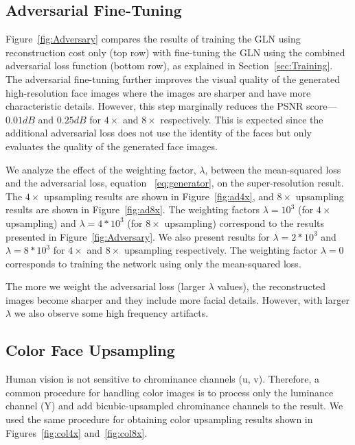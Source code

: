 \documentclass[runningheads]{llncs}
\begin{document}
\subsection{Adversarial Fine-Tuning}

Figure~\ref{fig:Adversary} compares the results of training the GLN using reconstruction cost only (top row) with fine-tuning the GLN using the combined adversarial loss function (bottom row), as explained in Section~\ref{sec:Training}. The adversarial fine-tuning further improves the visual quality of the generated high-resolution face images where the images are sharper and have more characteristic details. However, this step marginally reduces the PSNR score---$0.01dB$ and $0.25dB$ for $4 \times$ and $8 \times$ respectively. This is expected since the additional adversarial loss does not use the identity of the faces but only evaluates the quality of the generated face images.


We analyze the effect of the weighting factor, $\lambda$, between the mean-squared loss and the adversarial loss, equation ~\eqref{eq:generator}, on the super-resolution result. The $4 \times$ upsampling results are shown in Figure~\ref{fig:ad4x}, and $8 \times$ upsampling results are shown in Figure~\ref{fig:ad8x}. The weighting factors $\lambda=10^3$  (for $4 \times$ upsampling) and $\lambda=4*10^3$ (for $8 \times$ upsampling) correspond to the results presented in Figure~\ref{fig:Adversary}.  We also present results for $\lambda=2*10^3$ and $\lambda=8*10^3$ for $4 \times$ and  $8 \times$ upsampling respectively. The weighting factor  $\lambda=0$ corresponds to training the network using only the mean-squared loss.

The more we weight the adversarial loss (larger $\lambda$ values), the reconstructed images become sharper and they include more facial details. However, with larger $\lambda$ we also observe some high frequency artifacts.


\subsection{Color Face Upsampling}

Human vision is not sensitive to chrominance channels (u, v). Therefore, a common procedure for handling color images is to process only the luminance channel (Y) and add bicubic-upsampled chrominance channels to the result. We used the same procedure for obtaining color upsampling results shown in Figures~\ref{fig:col4x} and~\ref{fig:col8x}.
\end{document}
